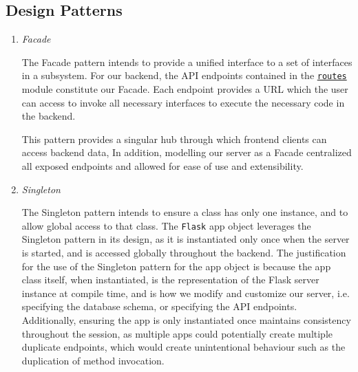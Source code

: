 \documentclass{article}
\begin{document}
\subsection{Design Patterns}
\begin{enumerate}
    \item \textit{Facade}
    
    The Facade pattern intends to provide a unified interface to a set of interfaces in a subsystem. 
    For our backend, the API endpoints contained in the \href{https://github.com/alextrosta/brackit/blob/master/backend/app/routes.py}{\texttt{routes}} module constitute our Facade. Each endpoint provides a URL which the user can access
    to invoke all necessary interfaces to execute the necessary code in the backend.

    This pattern provides a singular hub through which frontend clients can access backend data,
    In addition, modelling our server as a Facade centralized all exposed endpoints and allowed for ease of use and extensibility.

    \item \textit{Singleton} 
    
    The Singleton pattern intends to ensure a class has only one instance, and to allow global 
    access to that class. The \texttt{Flask} app object leverages the Singleton pattern in its design, as 
    it is instantiated only once when the server is started, and is accessed globally throughout the 
    backend. 
    The justification for the use of the Singleton pattern for the app object is because the app 
    class itself, when instantiated, is the representation of the Flask server instance at compile time,
    and is how we modify and customize our server, i.e. specifying the database schema, or specifying the API 
    endpoints. Additionally, ensuring the app is only instantiated once maintains consistency throughout the session,
    as multiple apps could potentially create multiple duplicate endpoints, which would create unintentional behaviour
    such as the duplication of method invocation.
\end{enumerate}
\clearpage
\end{document}
